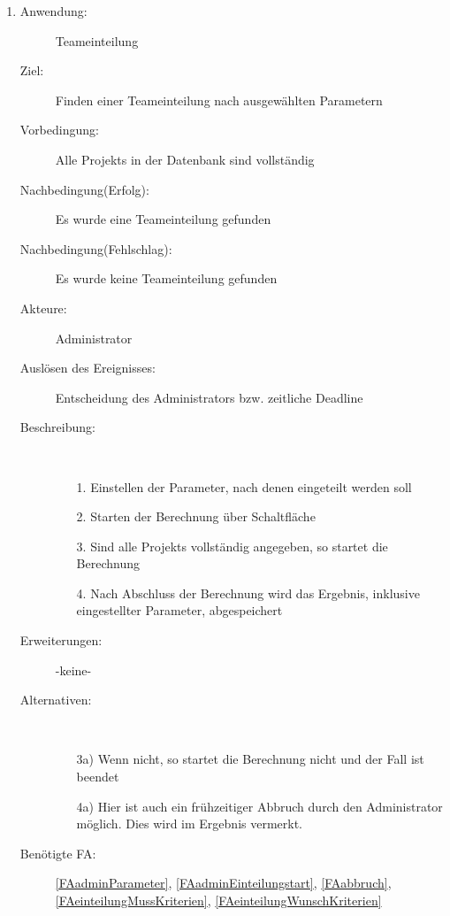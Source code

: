 \documentclass[parskip=full]{scrartcl}
\newcommand{\swtLabel}[1]{\textbf{/#1\arabic*0/}}
\begin{document}
\begin{enumerate} [label=\swtLabel{A}]
  
  \item \label{UCadminEinteilungStart}
  \begin{description}
  \item[Anwendung:] Teameinteilung
  \item[Ziel:] Finden einer Teameinteilung nach ausgewählten Parametern
  	\item[Vorbedingung:] Alle \glspl{Projekt} in der Datenbank sind vollständig
  	\item[Nachbedingung(Erfolg):] Es wurde eine Teameinteilung gefunden
  	\item[Nachbedingung(Fehlschlag):] Es wurde keine Teameinteilung gefunden
  	\item[Akteure:] Administrator
  	\item[Auslösen des Ereignisses:] Entscheidung des Administrators bzw.
  	zeitliche Deadline
  	\item[Beschreibung:]~
  	\begin{enumerate} 
  	  \item[1.] Einstellen der Parameter, nach denen eingeteilt werden soll
  	  \item[2.] Starten der Berechnung über Schaltfläche
  	  \item[3.] Sind alle \glspl{Projekt} vollständig angegeben, so startet die
  	  Berechnung
  	  \item[4.] Nach Abschluss der Berechnung wird das Ergebnis,  inklusive
  	  eingestellter Parameter, abgespeichert
  	\end{enumerate}
  	\item[Erweiterungen:] -keine-
  	\item[Alternativen:] ~
  	\begin{enumerate}
  	  \item[3a)] Wenn nicht, so startet die Berechnung nicht und der Fall ist
  	  beendet
  	  \item[4a)] Hier ist auch ein frühzeitiger Abbruch durch den Administrator
  	  möglich. Dies wird im Ergebnis vermerkt.
  	 \end{enumerate}  
  	 \item[Benötigte FA:] \ref{FAadminParameter},
  	 \ref{FAadminEinteilungstart}, \ref{FAabbruch},
  	 \ref{FAeinteilungMussKriterien}, \ref{FAeinteilungWunschKriterien}
  \end{description}
   

\end{enumerate}
\end{document}
